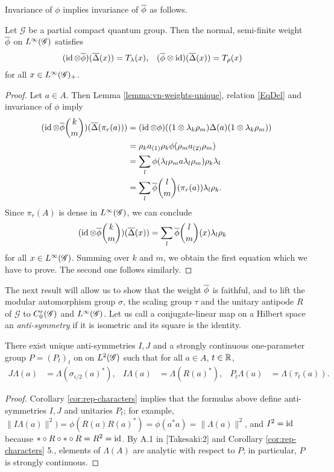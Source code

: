 Invariance of $\phi$ implies invariance of $\overline{\phi}$ as follows.
\begin{Prop} \label{prop:vn-invariance}
  Let $\mathscr{G}$ be a partial compact quantum group. Then the
  normal, semi-finite weight $\overline{\phi}$ on $L^{\infty}(\mathscr{G})$ satisfies
  \begin{align*}
    (\operatorname{id} \otimes \overline{\phi})(\overline{\Delta}(x)) &=  T_{\lambda}(x), &
    (\overline{\phi} \otimes \operatorname{id})(\overline{\Delta}(x)) &= T_{\rho}(x)
  \end{align*}
for all $x\in L^{\infty}(\mathscr{G})_{+}$.
\end{Prop}
\begin{proof}
  Let  $a \in A$.  Then Lemma \ref{lemma:vn-weights-unique}, relation \eqref{EqDel}
  and invariance of $\phi$ imply
  \begin{align*}
    (\operatorname{id} \otimes \overline{\phi}{k\choose m})(\overline{\Delta}(\pi_{r}(a))) &= (\operatorname{id} \otimes
    \phi)((1 \otimes \lambda_{k}\rho_{m})\Delta(a)(1 \otimes
    \lambda_{k}\rho_{m})) \\ & =
    \rho_{k}a_{(1)}\rho_{k}\phi(\rho_{m}a_{(2)}\rho_{m}) \\ & = \sum_{l}
    \phi(\lambda_{l}\rho_{m}a\lambda_{l}\rho_{m})\rho_{k}\lambda_{l} \\
    & = \sum_{l} \overline{\phi}{l\choose m}(\pi_{r}(a)) \lambda_{l}\rho_{k}.
  \end{align*}
  Since $\pi_{r}(A)$ is dense in $L^{\infty}(\mathscr{G})$, we can conclude
  \begin{align*}
    (\operatorname{id} \otimes \overline{\phi}{k\choose m}) (\overline{\Delta} (x)) &= \sum_{l} \overline{\phi}{l\choose m}(x) \lambda_{l}\rho_{k}
  \end{align*}
  for all $x \in L^{\infty}(\mathscr{G})$. Summing over $k$ and $m$, we obtain the
  first  equation which we have to prove. The second one follows similarly.
\end{proof}

The next result will allow us to show that the weight $\overline{\phi}$ is
faithful, and to lift the modular automorphism group $\sigma$,  the scaling
group $\tau$ and the unitary antipode $R$ of $\mathscr{G}$  to $C^{r}_{0}(\mathscr{G})$
and $L^{\infty}(\mathscr{G})$. Let us call a conjugate-linear map on a Hilbert space
an \emph{anti-symmetry} if it is isometric and its square is the identity.
\begin{Lem}
  There exist unique anti-symmetries $I,J$ and a strongly continuous
  one-parameter group $P=(P_{t})_{t}$ on
  on $L^{2}(\mathscr{G})$ such that for all $a\in A$, $t\in \mathbb{R}$,
  \begin{align*}
    J\Lambda(a) &= \Lambda(\sigma_{i/2}(a)^{*}), & I\Lambda(a) &=
    \Lambda(R(a)^{*}), & P_{t}\Lambda(a) &= \Lambda(\tau_{t}(a)).
  \end{align*}
\end{Lem}
\begin{proof}
  Corollary \ref{cor:rep-characters} implies that the formulas above
  define anti-symmetries $I,J$ and unitaries $P_{t}$; for
  example, $\|I\Lambda(a)\|^{2})=\phi(R(a)R(a)^{*})=
  \phi(a^{*}a)=\|\Lambda(a)\|^{2}$, and $I^{2} = \operatorname{id}$
  because $*\circ R \circ * \circ R=  R^{2}=\operatorname{id}$. By A.1 in \cite{}
  [Takesaki:2] and Corollary  \ref{cor:rep-characters} 5., elements of
  $\Lambda(A)$ are analytic with respect to $P$; in
  particular,  $P$ is strongly continuous.
\end{proof}

